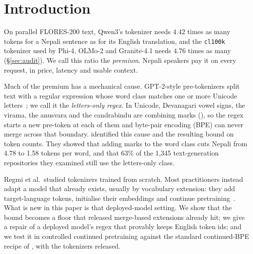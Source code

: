 \section{Introduction}

On parallel FLORES-200 text, Qwen3's tokenizer needs $4.42$ times as many tokens for a Nepali sentence as for its English translation, and the \texttt{cl100k} tokenizer used by Phi-4, OLMo-2 and Granite-4.1 needs $4.76$ times as many (\S\ref{sec:audit}). We call this ratio the \emph{premium}. Nepali speakers pay it on every request, in price, latency and usable context.

Much of the premium has a mechanical cause. GPT-2-style pre-tokenizers split text with a regular expression whose word class \pL{} matches one or more Unicode letters~\citep{gpt2encoder}; we call it the \emph{letters-only regex}. In Unicode, Devanagari vowel signs, the virama, the anusvara and the candrabindu are combining marks (\pM{}), so the regex starts a new pre-token at each of them and byte-pair encoding (BPE) can never merge across that boundary. \citet{regmi2026vowel} identified this cause and the resulting bound on token counts. They showed that adding marks to the word class cuts Nepali from 4.78 to 1.58 tokens per word, and that 63\% of the 1{,}345 text-generation repositories they examined still use the letters-only class.

Regmi et al.\ studied tokenizers trained from scratch. Most practitioners instead adapt a model that already exists, usually by vocabulary extension: they add target-language tokens, initialise their embeddings and continue pretraining~\citep{tejaswi-etal-2024-exploring,yamaguchi2026lowres,purason-etal-2026-teaching,smith2026inplace}. What is new in this paper is that deployed-model setting. We show that the bound becomes a floor that released merge-based extensions already hit; we give a repair of a deployed model's regex that provably keeps English token ids; and we test it in controlled continued pretraining against the standard continued-BPE recipe of \citet{purason-etal-2026-teaching}, with the tokenizers released.

